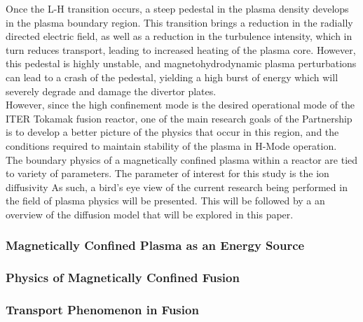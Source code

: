 \documentclass{article}
\begin{document}
Once the L-H transition occurs, a steep pedestal in the plasma density develops in the plasma boundary region. This transition brings a reduction in the radially directed electric field, as well as a reduction in the turbulence intensity, which in turn reduces transport, leading to increased heating of the plasma core. However, this pedestal is highly unstable, and magnetohydrodynamic plasma perturbations can lead to a crash of the pedestal, yielding a high burst of energy which will severely degrade and damage the divertor plates. \\

However, since the high confinement mode is the desired operational mode of the ITER Tokamak fusion reactor, one of the main research goals of the Partnership is to develop a better picture of the physics that occur in this region, and the conditions required to maintain stability of the plasma in H-Mode operation.\\

 \cite{PPPL_P:2}
The boundary physics of a magnetically confined plasma within a reactor are tied to variety of parameters. The parameter of interest for this study is the ion diffusivity 
As such, a bird's eye view of the current research being performed in the field of plasma physics will be presented. \cite{J_Friedberg:1}
This will be followed by a an overview of the diffusion model that will be explored in this paper.\\
\subsubsection{Magnetically Confined Plasma as an Energy Source}
\subsubsection{Physics of Magnetically Confined Fusion}
\subsubsection{Transport Phenomenon in Fusion}
\newpage


\end{document}
